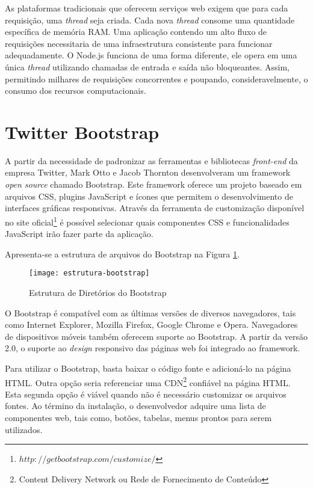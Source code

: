As plataformas tradicionais que oferecem serviços web exigem que para cada requisição, uma \textit{thread} seja criada. Cada nova \textit{thread} consome uma quantidade específica de memória RAM. Uma aplicação contendo um alto fluxo de requisições necessitaria de uma infraestrutura consistente para funcionar adequadamente. O Node.js funciona de uma forma diferente, ele opera em uma única \textit{thread} utilizando chamadas de entrada e saída não bloqueantes. Assim, permitindo milhares de requisições concorrentes e poupando, consideravelmente, o consumo dos recursos computacionais.

\section{Twitter Bootstrap}

A partir da necessidade de padronizar as ferramentas e bibliotecas \textit{front-end} da empresa Twitter, Mark Otto e Jacob Thornton desenvolveram um framework \textit{open source} chamado Bootstrap. Este framework oferece um projeto baseado em arquivos CSS, plugins JavaScript e ícones que permitem o desenvolvimento de interfaces gráficas responsivas. Através da ferramenta de customização disponível no site oficial\footnote{$http://getbootstrap.com/customize/$} é possível selecionar quais componentes CSS e funcionalidades JavaScript irão fazer parte da aplicação.

Apresenta-se a estrutura de arquivos do Bootstrap na Figura \ref{estrutura-bootstrap}.

\graphicspath{{figuras/}}
\begin{figure}[H]
\centering
\texttt{[image: estrutura-bootstrap]}
\caption{Estrutura de Diretórios do Bootstrap}
\label{estrutura-bootstrap}
\end{figure}

O Bootstrap é compatível com as últimas versões de diversos navegadores, tais como Internet Explorer, Mozilla Firefox, Google Chrome e Opera. Navegadores de dispositivos móveis também oferecem suporte ao Bootstrap. A partir da versão 2.0, o suporte ao \textit{design} responsivo das páginas web foi integrado ao framework.

Para utilizar o Bootstrap, basta baixar o código fonte e adicioná-lo na página HTML. Outra opção seria referenciar uma CDN\footnote{Content Delivery Network ou Rede de Fornecimento de Conteúdo} confiável na página HTML. Esta segunda opção é viável quando não é necessário customizar os arquivos fontes. Ao término da instalação, o desenvolvedor adquire uma lista de componentes web, tais como, botões, tabelas, menus prontos para serem utilizados. 

